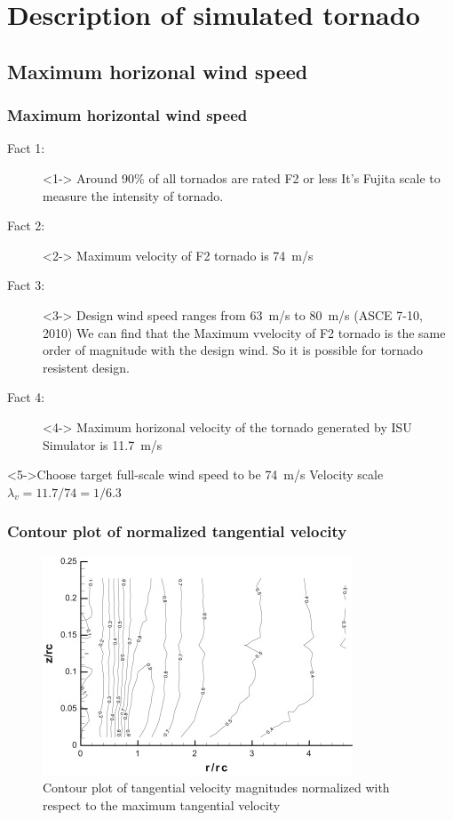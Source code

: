 \documentclass[handout]{beamer}
\begin{document}
\section{Description of simulated tornado}
\subsection{Maximum horizonal wind speed}

\begin{frame}
	\frametitle{Maximum horizontal wind speed}
	\begin{description}
		\item[Fact 1:  ]<1-> Around 90\% of all tornados are rated F2 or less
			 {It's Fujita scale to measure the intensity of tornado.}
		\item[Fact 2: ]<2-> Maximum velocity of F2 tornado is \alert{\SI{74}{m/s}}
		\item[Fact 3: ]<3-> Design wind speed ranges from \alert{\SI{63}{m/s}} to \alert{\SI{80}{m/s}} (ASCE 7-10, 2010)
			 {We can find that the Maximum vvelocity of F2 tornado is the same order of magnitude with the design wind. So it is possible for tornado resistent design.}
		\item[Fact 4: ]<4-> Maximum horizonal velocity of the tornado generated by ISU Simulator is \alert{\SI{11.7}{m/s}}
	\end{description}
	\begin{block}<5->{Choose target full-scale wind speed to be \alert{\SI{74}{m/s}}}
			 Velocity scale $\lambda_v=11.7/74=1/6.3$
	\end{block} 
\end{frame}

\begin{frame}
	\frametitle{Contour plot of normalized tangential velocity}
	\begin{figure}
	\centering
	\caption{Contour plot of tangential velocity magnitudes normalized with respect to the maximum tangential velocity}
	\includegraphics{./fig/1.jpg}
	\end{figure}

\end{frame}
\end{document}
